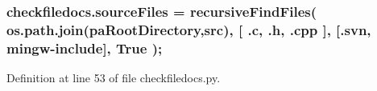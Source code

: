 \subsubsection[{\texorpdfstring{source\+Files}{sourceFiles}}]{\setlength{\rightskip}{0pt plus 5cm}checkfiledocs.\+source\+Files = {\bf recursive\+Find\+Files}( os.\+path.\+join({\bf pa\+Root\+Directory},\textquotesingle{}src\textquotesingle{}), \mbox{[} \textquotesingle{}.{\bf c}\textquotesingle{}, \textquotesingle{}.h\textquotesingle{}, \textquotesingle{}.cpp\textquotesingle{} \mbox{]}, \mbox{[}\textquotesingle{}.svn\textquotesingle{}, \textquotesingle{}mingw-\/include\textquotesingle{}\mbox{]}, True );}\hypertarget{namespacecheckfiledocs_af96459a5c473c4f00087842c26c9d88a}{}\label{namespacecheckfiledocs_af96459a5c473c4f00087842c26c9d88a}


Definition at line 53 of file checkfiledocs.\+py.


